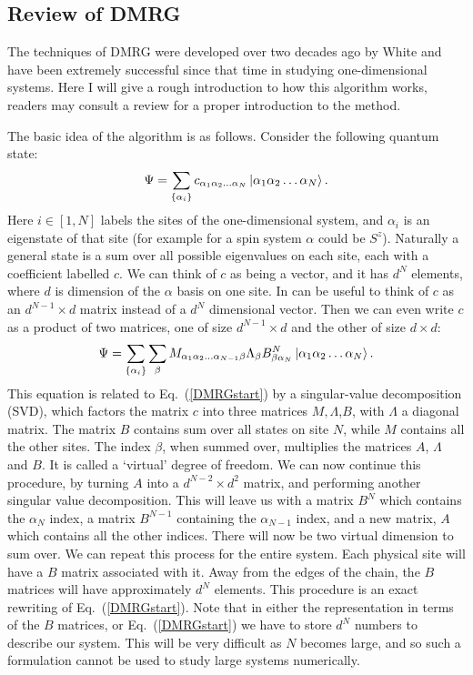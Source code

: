 \subsection{Review of DMRG}

The techniques of DMRG were developed over two decades ago by White\cite{WhiteDMRG} and have been extremely successful since that time in studying one-dimensional systems. Here I will give a rough introduction to how this algorithm works, readers may consult a review for a proper introduction to the method\cite{Schollwock}.

The basic idea of the algorithm is as follows. Consider the following quantum state:
\begin{equation}
\Psi=\sum_{\{\alpha_i\}} c_{\alpha_1\alpha_2\ldots\alpha_N}\ket{\alpha_1\alpha_2\ldots\alpha_N}.
\label{DMRGstart}
\end{equation}
Here $i\in[1,N]$ labels the sites of the one-dimensional system, and $\alpha_i$ is an eigenstate of that site (for example for a spin system $\alpha$ could be $S^z$). Naturally a general state is a sum over all possible eigenvalues on each site, each with a coefficient labelled $c$. We can think of $c$ as being a vector, and it has $d^N$ elements, where $d$ is dimension of the $\alpha$ basis on one site. In can be useful to think of $c$ as an $d^{N-1}\times d$ matrix instead of a $d^N$ dimensional vector. Then we can even write $c$ as a product of two matrices, one of size $d^{N-1}\times d$ and the other of size $d\times d$:
\begin{equation}
\Psi=\sum_{\{\alpha_i\}}\sum_\beta M_{\alpha_1\alpha_2\ldots\alpha_{N-1}\beta}\Lambda_\beta B^N_{\beta\alpha_N}\ket{\alpha_1\alpha_2\ldots\alpha_N}.
\end{equation}
This equation is related to Eq.~(\ref{DMRGstart}) by a singular-value decomposition (SVD), which factors the matrix $c$ into three matrices $M,\Lambda$,$B$, with $\Lambda$ a diagonal matrix. The matrix $B$ contains sum over all states on site $N$, while $M$ contains all the other sites. The index $\beta$, when summed over, multiplies the matrices $A$, $\Lambda$ and $B$. It is called a `virtual' degree of freedom. We can now continue this procedure, by turning $A$ into a $d^{N-2}\times d^2$ matrix, and performing another singular value decomposition. This will leave us with a matrix $B^N$ which contains the $\alpha_N$ index, a matrix $B^{N-1}$ containing the $\alpha_{N-1}$ index, and a new matrix, $A$ which contains all the other indices. There will now be two virtual dimension to sum over. We can repeat this process for the entire system. Each physical site will have a $B$ matrix associated with it. Away from the edges of the chain, the $B$ matrices will have approximately $d^N$ elements. This procedure is an exact rewriting of Eq.~(\ref{DMRGstart}). Note that in either the representation in terms of the $B$ matrices, or Eq.~(\ref{DMRGstart}) we have to store $d^N$ numbers to describe our system. This will be very difficult as $N$ becomes large, and so such a formulation cannot be used to study large systems numerically.

